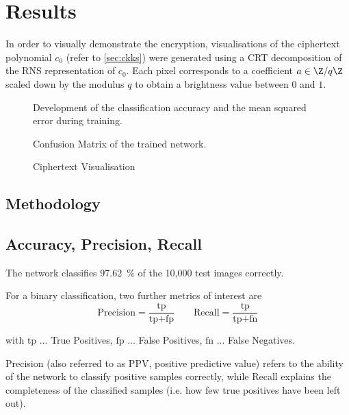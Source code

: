 \chapter{Results}
In order to visually demonstrate the encryption, visualisations of the ciphertext polynomial $c_0$ (refer to \autoref{sec:ckks}) were generated using a CRT decomposition of the RNS representation of $c_0$.
Each pixel corresponds to a coefficient $a \in \Z / q\Z$ scaled down by the modulus $q$ to obtain a brightness value between $0$ and $1$.

\begin{figure}[H]
  \centering
  \pgfplotsset{/pgfplots/group/.cd,vertical sep=1.6cm}
  \caption{Development of the classification accuracy and the mean squared error during training.}
\end{figure}

\begin{figure}[H]
  \centering
  \caption{Confusion Matrix of the trained network.}
\end{figure}

\begin{figure}[H]
  \centering
  \caption{Ciphertext Visualisation}
\end{figure}

\section{Methodology}

\section{Accuracy, Precision, Recall}
The network classifies \SI{97.62}{\percent} of the 10,000 test images correctly.

For a binary classification, two further metrics of interest are
$$\text{Precision} = \frac{\text{tp}}{\text{tp} + \text{fp}} \quad\quad
  \text{Recall} = \frac{\text{tp}}{\text{tp} + \text{fn}}$$

with
$\text{tp}$ ... True Positives,
$\text{fp}$ ... False Positives,
$\text{fn}$ ... False Negatives.

Precision (also referred to as PPV, positive predictive value) refers to the ability of the network to classify positive samples correctly, while Recall explains the completeness of the classified samples (i.e. how few true positives have been left out).


